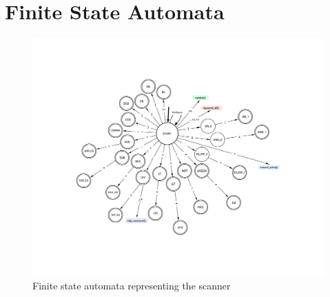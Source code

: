 \documentclass[12pt]{article}
\begin{document}
\section{Finite State Automata}
\label{figure:fsm}
\begin{figure}[H]
		\centering
		\hspace*{-1cm}
		\includegraphics[width=1.2\linewidth]{img/fsm.pdf}
		\hspace*{-1cm}
		\caption{Finite state  automata representing the scanner}
\end{figure}
\end{document}

